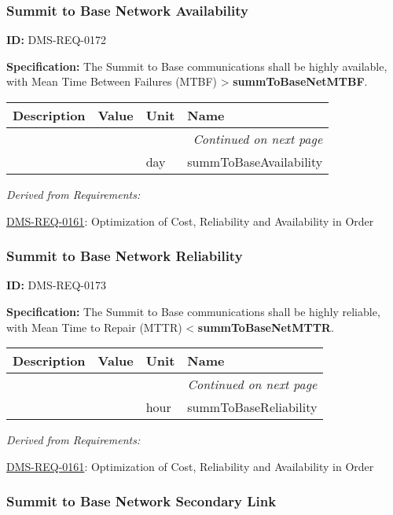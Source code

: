 \documentclass[SE,toc,lsstdraft]{lsstdoc}
\makeatletter
\newcommand{\paramname}[1]{\hspace{0pt}#1}
\newcommand{\unitname}[1]{\hspace{0pt}#1}
\newenvironment{parameters}[0]{%
\setlength\LTleft{0pt}
\setlength\LTright{\fill}
\begin{small}
\begin{longtable}[]{|p{0.5\textwidth}|l|p{0.6in}|p{1.74in}@{}|}

\hline \textbf{Description} & \textbf{Value} & \textbf{Unit} & \textbf{Name} \\ \hline
\endhead

\hline \multicolumn{4}{r}{\emph{Continued on next page}} \\
\endfoot

\hline\hline
\endlastfoot
}{%
\hline
\end{longtable}
\end{small}
}
\makeatother
\begin{document}
\subsubsection{Summit to Base Network Availability}

\label{DMS-REQ-0172}
\textbf{ID:} DMS-REQ-0172

\textbf{Specification:} The Summit to Base communications shall be highly available, with Mean Time Between Failures (MTBF) > \textbf{summToBaseNetMTBF}.





\begin{parameters}

&

&
\unitname{%
day
}
&
\paramname{%
summToBaseAvailability
} \\\hline
\end{parameters}




\emph{Derived from Requirements:}

\hyperref[DMS-REQ-0161]{DMS-REQ-0161}:
Optimization of Cost, Reliability and Availability in Order \newline


\subsubsection{Summit to Base Network Reliability}

\label{DMS-REQ-0173}
\textbf{ID:} DMS-REQ-0173

\textbf{Specification:} The Summit to Base communications shall be highly reliable, with Mean Time to Repair (MTTR) < \textbf{summToBaseNetMTTR}.





\begin{parameters}

&

&
\unitname{%
hour
}
&
\paramname{%
summToBaseReliability
} \\\hline
\end{parameters}




\emph{Derived from Requirements:}

\hyperref[DMS-REQ-0161]{DMS-REQ-0161}:
Optimization of Cost, Reliability and Availability in Order \newline


\subsubsection{Summit to Base Network Secondary Link}
\end{document}
